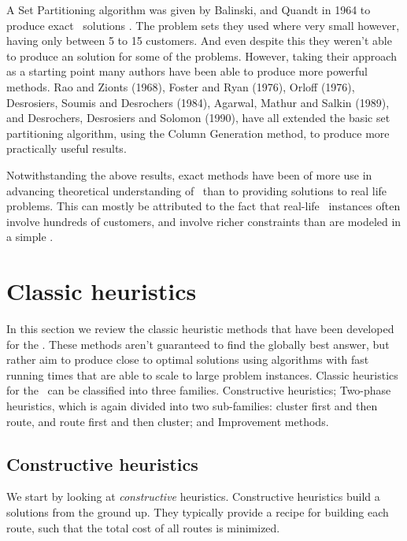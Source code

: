 A Set Partitioning algorithm was given by Balinski, and Quandt in 1964 to produce exact \VRP\ solutions \cite{balinski:64}. The problem sets they used where very small however, having only between 5 to 15 customers. And even despite this they weren't able to produce an solution for some of the problems. However, taking their approach as a starting point many authors have been able to produce more powerful methods. Rao and Zionts (1968), Foster and Ryan (1976), Orloff (1976), Desrosiers, Soumis and Desrochers (1984), Agarwal, Mathur and Salkin (1989), and Desrochers, Desrosiers and Solomon (1990), have all extended the basic set partitioning algorithm, using the Column Generation method, to produce more practically useful results. 

Notwithstanding the above results, exact methods have been of more use in advancing theoretical understanding of \VRP\ than to providing solutions to real life problems. This can mostly be attributed to the fact that real-life \VRP\ instances often involve hundreds of customers, and involve richer constraints than are modeled in a simple \VRP.

\section{Classic heuristics}
\label{sec:ch}

In this section we review the classic heuristic methods that have been developed for the \VRP. These methods aren't guaranteed to find the globally best answer, but rather aim to produce close to optimal solutions using algorithms with fast running times that are able to scale to large problem instances. Classic heuristics for the \VRP\ can be classified into three families. Constructive heuristics; Two-phase heuristics, which is again divided into two sub-families: cluster first and then route, and route first and then cluster; and Improvement methods.

\subsection{Constructive heuristics}
\label{subsec:conheu}

We start by looking at \emph{constructive} heuristics. Constructive heuristics build a solutions from the ground up. They typically provide a recipe for building each route, such that the total cost of all routes is minimized.


